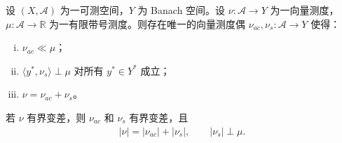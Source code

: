 \documentclass[../../main.tex]{subfiles}%
\begin{document}
\begin{theorem}[Lebesgue 分解]\label{theorem:ch01-向量Lebesgue分解}
设 $(X,\mathcal{A})$ 为一可测空间，$Y$ 为 Banach 空间。设 $\nu:\mathcal{A}\to Y$ 为一向量测度，$\mu:\mathcal{A}\to\mathbb{R}$ 为一有限带号测度。则存在唯一的向量测度偶 $\nu_{ac},\nu_s:\mathcal{A}\to Y$ 使得：
\begin{enumerate}[(i)]
\item $\nu_{ac}\ll\mu$；
\item $\langle y^*,\nu_s\rangle\perp\mu$ 对所有 $y^*\in Y^*$ 成立；
\item $\nu=\nu_{ac}+\nu_s$。
\end{enumerate}
若 $\nu$ 有界变差，则 $\nu_{ac}$ 和 $\nu_s$ 有界变差，且
\begin{align}
|\nu|=|\nu_{ac}|+|\nu_s|,\qquad |\nu_s|\perp\mu. \label{align:ch01-向量Lebesgue分解}
\end{align}
\end{theorem}
\end{document}
